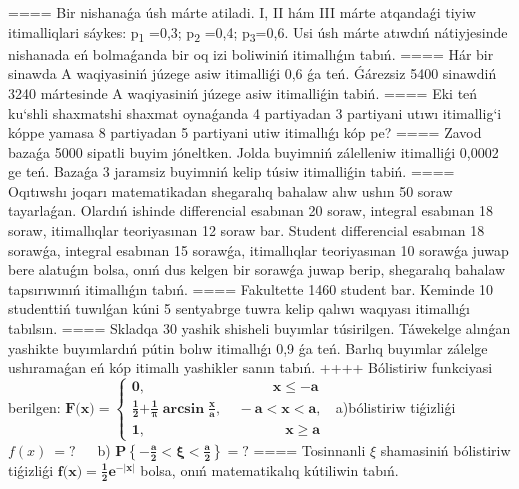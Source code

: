 ====
Bir nishanaǵa úsh márte atiladi. I, II hám III márte atqandaǵi tiyiw itimalliqlari sáykes: p\textsubscript{1} =0,3; p\textsubscript{2} =0,4; p\textsubscript{3}=0,6. Usi úsh márte atıwdıń nátiyjesinde nishanada eń bolmaǵanda bir oq izi boliwiniń itimallıǵın tabıń.
====
Hár bir sinawda A waqiyasiniń júzege asiw itimalliǵi 0,6 ǵa teń. Ǵárezsiz 5400 sinawdiń 3240 mártesinde A waqiyasiniń júzege asiw itimalliǵin tabiń.
====
Eki teń ku`shli shaxmatshi shaxmat oynaǵanda 4 partiyadan 3 partiyani utıwı itimallig`i kóppe yamasa 8 partiyadan 5 partiyani utiw itimallıǵı kóp pe?
====
Zavod bazaǵa 5000 sipatli buyim jóneltken. Jolda buyimniń zálelleniw itimalliǵi 0,0002 ge teń. Bazaǵa 3 jaramsiz buyimniń kelip túsiw itimalliǵin tabiń.
====
Oqıtıwshı joqarı matematikadan shegaralıq bahalaw alıw ushın 50 soraw tayarlaǵan. Olardıń ishinde differencial esabınan 20 soraw, integral esabınan 18 soraw, itimallıqlar teoriyasınan 12 soraw bar. Student differencial esabınan 18 sorawǵa, integral esabınan 15 sorawǵa, itimallıqlar teoriyasınan 10 sorawǵa juwap bere alatuǵın bolsa, onıń dus kelgen bir sorawǵa juwap berip, shegaralıq bahalaw tapsırıwınıń itimallıǵın tabıń.
====
Fakultette 1460 student bar. Keminde 10 studenttiń tuwılǵan kúni 5 sentyabrge tuwra kelip qalıwı waqıyası itimallıǵı tabılsın.
====
Skladqa 30 yashik shisheli buyımlar túsirilgen. Táwekelge alınǵan yashikte buyımlardıń pútin bolıw itimallıǵı 0,9 ǵa teń. Barlıq buyımlar zálelge ushıramaǵan eń kóp itimallı yashikler sanın tabıń.
++++
Bólistiriw funkciyasi berilgen: \(\mathbf{F}\mathbf{(}\mathbf{x}\mathbf{)}\mathbf{=}\left\{ \begin{matrix}
\mathbf{0,}\mathbf{\ \ \ \ \ \ \ \ \ \ \ \ \ \ \ \ \ \ \ \ \ \ \ \ \ \ \ \ \ \ \ \ \ \ \ \ \ \ \ \ \ x \leq - a} \\
\frac{\mathbf{1}}{\mathbf{2}}\mathbf{+}\frac{\mathbf{1}}{\mathbf{\pi}}\mathbf{\arcsin}\frac{\mathbf{x}}{\mathbf{a}}\mathbf{,}\mathbf{\ \ \ \ \  - a < x < a}\mathbf{,} \\
\mathbf{1,}\mathbf{\ \ \ \ \ \ \ \ \ \ \ \ \ \ \ \ \ \ \ \ \ \ \ \ \ \ \ \ \ \ \ \ \ \ \ \ \ \ \ \ \ \ \ \ \ x \geq a}
\end{matrix} \right.\ \) a)bólistiriw tiǵizliǵi \(f(x)\  = ?\ \ \ \ \ \ \ \)b) \(\mathbf{P}\left\{ \mathbf{-}\frac{\mathbf{a}}{\mathbf{2}}\mathbf{< \xi <}\frac{\mathbf{a}}{\mathbf{2}} \right\}\mathbf{=}\mathbf{?}\)
====
Tosinnanli $\xi$ shamasiniń bólistiriw tiǵizliǵi \(\mathbf{f}\mathbf{(}\mathbf{x}\mathbf{)}\mathbf{=}\frac{\mathbf{1}}{\mathbf{2}}\mathbf{e}^{\mathbf{-}\left| \mathbf{x} \right|}\) bolsa, onıń matematikalıq kútiliwin tabıń.
